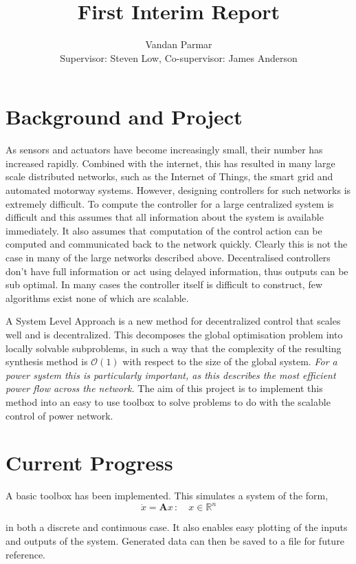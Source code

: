 \documentclass[11pt,a4paper]{article}
\begin{document}
\title{First Interim Report}
\author{Vandan Parmar \\
Supervisor: Steven Low, Co-supervisor: James Anderson}
\maketitle
\section{Background and Project}
As sensors and actuators have become increasingly small, their number has increased rapidly. Combined with the internet, this has resulted in many large scale distributed networks, such as the Internet of Things, the smart grid and automated motorway systems. However, designing controllers for such networks is extremely difficult. To compute the controller for a large centralized system is difficult and this assumes that all information about the system is available immediately. It also assumes that computation of the control action can be computed and communicated back to the network quickly. Clearly this is not the case in many of the large networks described above. Decentralised controllers don't have full information or act using delayed information, thus outputs can be sub optimal. In many cases the controller itself is difficult to construct, few algorithms exist none of which are scalable.

A System Level Approach \cite{Wang2017} is a new method for decentralized control that scales well and is decentralized. This decomposes the global optimisation problem into locally solvable subproblems, in such a way that the complexity of the resulting synthesis method is $\mathcal{O}(1)$ with respect to the size of the global system.\textit{ For a power system this is particularly important, as this describes the most efficient power flow across the network.} The aim of this project is to implement this method into an easy to use toolbox to solve problems to do with the scalable control of power network.

\section{Current Progress}
A basic toolbox has been implemented. This simulates a system of the form, 
$$\dot{x} = \textbf{A}x \,: \quad x \in \mathbb{R}^{n}$$

in both a discrete and continuous case. It also enables easy plotting of the inputs and outputs of the system. Generated data can then be saved to a file for future reference. 
\end{document}
